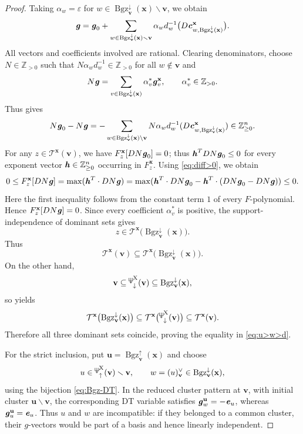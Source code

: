 \documentclass[11pt,reqno]{amsart}
\newcommand{\Neptune}{\mathord{\text{\tikz[baseline=-.5ex,scale=.13]{\draw[line width=.45pt] (0,0)--(0,1.8) (-.6,1.8)--(-.6,.8)--(.6,.8)--(.6,1.8) (-.35,.35)--(.35,.35);}}}}
\theoremstyle{plain}
\theoremstyle{definition}
\numberwithin{equation}{section}
\newcommand\ZZ{\mathbb{Z}}
\newcommand\<{\langle}
\renewcommand\>{\rangle}
\renewcommand{\setminus}{\smallsetminus}
\def\vv{\mathbf{v}}
\def\uu{\mathbf{u}}
\def\sink{X}
\newcommand{\ccpt}[1]{\mathrm{#1}}%
\def\xevo{\ccpt{X}}%
\newcommand{\bfit}[1]{\textbf{\textit{#1}}}
\def\xx{\mathbf{x}}%
\def\cvec{\bfit{c}}
\def\gvec{\bfit{g}}
\def\Fpoly{{F}}
\newcommand{\Bgzp}[2]{\operatorname{Bgz}^{\uparrow}_{#2}(#1)}
\newcommand{\Bgzm}[2]{\operatorname{Bgz}^{\downarrow}_{#2}(#1)}
\newcommand{\suppd}[1]{\operatorname{\Neptune}_{\downarrow}^{#1}}
\newcommand{\suppu}[1]{\operatorname{\Neptune}_{\uparrow}^{#1}}
\newcommand{\DT}[1]{#1^{\vee}}
\def\ZZp{\ZZ_{\ge0}}
\newcommand{\dom}[1]{\mathcal{T}^{#1}}
\begin{document}
\begin{proof}
Taking $\alpha_w=\varepsilon$ for $w\in\Bgzm{\xx}{\vv}\setminus\vv$, we obtain
\[
    \gvec
    =
    \gvec_0+
    \sum_{
        w\in
        \Bgzm{\xx}{\vv}
        \setminus\vv}
    \alpha_w d_w^{-1}
    \bigl(
        D\cvec^{\xx}_{
            w,\Bgzm{\xx}{\vv}}
    \bigr).
\]
All vectors and coefficients involved are rational.
Clearing denominators, choose $N\in\mathbb Z_{>0}$ such that
$N\alpha_wd_w^{-1}\in\mathbb Z_{>0}$ for all
$w\notin\vv$ and
\[
    N\gvec
    =
    \sum_{
        v\in\Bgzm{\xx}{\vv}}
    \alpha_v^*\gvec_v^{\xx},
    \qquad
    \alpha_v^*\in\mathbb Z_{>0}.
\]
Thus  gives
\begin{gather}\label{eq:diff>0}
    N\bfit{g}_0-N\bfit{g}=
-\sum_{w\in\Bgzm{{\xx}}{\vv}\backslash\vv} N \alpha_w d^{-1}_w(D\cvec^{{\xx}}_{w,\Bgzm{\xx}{\vv}})\in\ZZp^n.
\end{gather}
For any $z\in\dom{{\xx}}(\vv)$, we have $\Fpoly^{{\xx}}_z[DN\gvec_0]=0$; thus $\bfit{h}^T DN\gvec_0\le0$ for every exponent vector $\bfit{h}\in\ZZp^{n}$ occurring in $\Fpoly^{{\xx}}_z$.
Using \eqref{eq:diff>0}, we obtain
\[
    0\le
    \Fpoly^{{\xx}}_z[DN\bfit{g}]=\max(\bfit{h}^T\cdot DN\gvec)=\max(\bfit{h}^T\cdot DN\gvec_0-\bfit{h}^T\cdot(DN\bfit{g}_0-DN\bfit{g}))\le 0.
\]
Here the first inequality follows from the constant term $1$ of every
$F$-polynomial.
Hence $F_z^{\xx}[DN\gvec]=0$.
Since every coefficient $\alpha_v^*$ is positive,
the support-independence of dominant sets
\cite[Proposition~7.4(iii)]{Cao} gives
\[
    z\in
    \dom{\xx}
    \bigl(\Bgzm{\xx}{\vv}\bigr).
\]
Thus
\[
    \dom{\xx}(\vv)
    \subseteq
    \dom{\xx}
    \bigl(\Bgzm{\xx}{\vv}\bigr).
\]
On the other hand,
\[
    \vv
    \subseteq
    \suppd{\xevo}(\vv)
    \subseteq
    \Bgzm{\xx}{\vv},
\]
so  yields
\[
    \dom{\xx}
    \bigl(\Bgzm{\xx}{\vv}\bigr)
    \subseteq
    \dom{\xx}
    \bigl(\suppd{\xevo}(\vv)\bigr)
    \subseteq
    \dom{\xx}(\vv).
\]
Therefore all three dominant sets coincide, proving the equality in \eqref{eq:u>w>d}.

For the strict inclusion, put $\uu=\Bgzp{\xx}{\vv}$ and choose
\[
u\in\suppu{\xevo}(\vv)\setminus\vv,
\qquad w=\DT{(u)}_\vv\in\Bgzm{\xx}{\vv},
\]
using the bijection \eqref{eq:Bgz-DT}.  
In the reduced cluster pattern at $\vv$, with initial cluster $\uu\setminus\vv$, the corresponding DT variable satisfies
$\gvec^{\uu}_w=-\bfit e_u$, whereas $\gvec^{\uu}_u=\bfit e_u$.
Thus $u$ and $w$ are incompatible: if they belonged to a common cluster, their
$g$-vectors would be part of a basis and hence linearly independent.


\end{proof}
\end{document}
